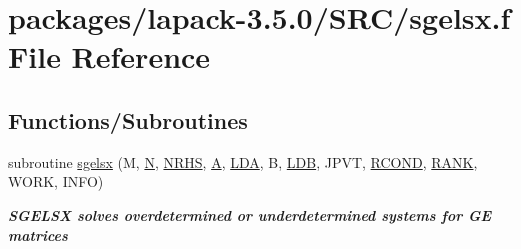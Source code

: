\hypertarget{sgelsx_8f}{}\section{packages/lapack-\/3.5.0/\+S\+R\+C/sgelsx.f File Reference}
\label{sgelsx_8f}
\subsection*{Functions/\+Subroutines}
\begin{DoxyCompactItemize}
\item 
subroutine \hyperlink{group__realGEsolve_gafa85959c07f700d3f4240a2f4132e3b1}{sgelsx} (M, \hyperlink{polmisc_8c_a0240ac851181b84ac374872dc5434ee4}{N}, \hyperlink{example__user_8c_aa0138da002ce2a90360df2f521eb3198}{N\+R\+H\+S}, \hyperlink{classA}{A}, \hyperlink{example__user_8c_ae946da542ce0db94dced19b2ecefd1aa}{L\+D\+A}, B, \hyperlink{example__user_8c_a50e90a7104df172b5a89a06c47fcca04}{L\+D\+B}, J\+P\+V\+T, \hyperlink{superlu__enum__consts_8h_af00a42ecad444bbda75cde1b64bd7e72a9b5c151728d8512307565994c89919d5}{R\+C\+O\+N\+D}, \hyperlink{splinemodule_8c_a3a88bcc63386de30443dacede2e01847}{R\+A\+N\+K}, W\+O\+R\+K, I\+N\+F\+O)
\begin{DoxyCompactList}\small\item\em {\bfseries  S\+G\+E\+L\+S\+X solves overdetermined or underdetermined systems for G\+E matrices} \end{DoxyCompactList}\end{DoxyCompactItemize}
